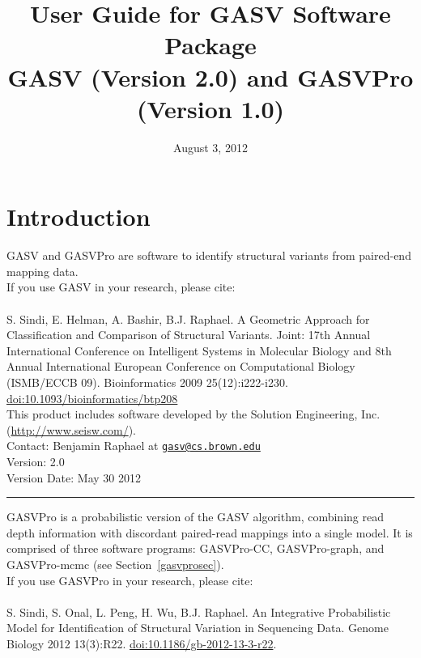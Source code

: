 \documentclass[11pt]{article}
\title{User Guide for GASV Software Package
\\GASV (Version 2.0) and GASVPro (Version 1.0)}
\date{August 3, 2012}                                           %
\newcommand{\sectionline}{
  \nointerlineskip \vspace{\baselineskip}
  \hspace{\fill}\rule{0.3\linewidth}{.7pt}\hspace{\fill}
  \par\nointerlineskip \vspace{\baselineskip}
}
\begin{document}

\maketitle

\tableofcontents
\clearpage

\section{Introduction}

GASV and GASVPro are software to identify structural variants from paired-end mapping data. \\

\noindent If you use GASV in your research, please cite: \\ \\
S. Sindi, E. Helman, A. Bashir, B.J. Raphael. A Geometric Approach for
Classification and Comparison of Structural Variants. Joint: 17th
Annual International Conference on Intelligent Systems in Molecular
Biology and 8th Annual International European Conference on
Computational Biology (ISMB/ECCB 09).  Bioinformatics 2009
25(12):i222-i230. \href{http://dx.doi.org/10.1093/bioinformatics/btp208}{doi:10.1093/bioinformatics/btp208}\\

\noindent This product includes software developed by the Solution Engineering,
Inc. (\url{http://www.seisw.com/}).\\

\noindent Contact: Benjamin Raphael at \href{mailto:gasv@cs.brown.edu}{\nolinkurl{gasv@cs.brown.edu}}\\

\noindent Version: 2.0 \\
\noindent Version Date: May 30 2012 

\sectionline

\noindent GASVPro is a probabilistic version of the GASV algorithm, combining read depth information with discordant paired-read mappings into a single model. It is comprised of three software programs: GASVPro-CC, GASVPro-graph, and GASVPro-mcmc (see Section~\ref{gasvprosec}). \\ 

\noindent If you use GASVPro in your research, please cite: \\ \\ 
S. Sindi, S. Onal, L. Peng, H. Wu, B.J. Raphael. An Integrative Probabilistic Model for Identification of Structural Variation in Sequencing Data. Genome Biology 2012 13(3):R22. \href{http://dx.doi.org/10.1186/gb-2012-13-3-r22}{doi:10.1186/gb-2012-13-3-r22}.\\
\end{document}
